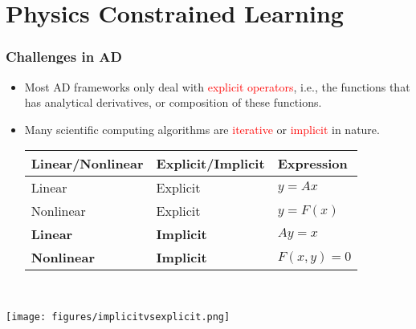 \documentclass[usenames,dvipsnames]{beamer}
\begin{document}
\section{Physics Constrained Learning}

\begin{frame}
	
	
	\frametitle{Challenges in AD}
	
	
	\begin{minipage}{0.695\textwidth}
		\vspace{-6cm}
		\begin{itemize}
			\item Most AD frameworks only deal with \textcolor{red}{explicit operators}, i.e., the functions that has analytical derivatives, or composition of these functions. 
			\item Many scientific computing algorithms are \textcolor{red}{iterative} or \textcolor{red}{implicit} in nature.
			\vspace{1cm}
			{\small
			\begin{table}[]
				\begin{tabular}{@{}lll@{}}
					\toprule
					Linear/Nonlinear & Explicit/Implicit & Expression   \\ \midrule
					Linear           & Explicit          & $y=Ax$       \\
					Nonlinear        & Explicit          & $y = F(x)$   \\
					\textbf{Linear}           & \textbf{Implicit}          & $Ay = x$     \\
					\textbf{Nonlinear}        & \textbf{Implicit}          & $F(x,y) = 0$ \\ \bottomrule
				\end{tabular}
			\end{table}
		}
		\end{itemize}
	\end{minipage}~
	\begin{minipage}[t]{0.3\textwidth}
		\texttt{[image: figures/implicitvsexplicit.png]}
	\end{minipage}
	
	
\end{frame}
\end{document}
